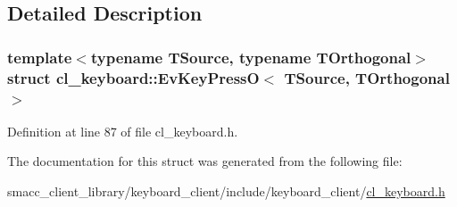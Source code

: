 \subsection{Detailed Description}
\subsubsection*{template$<$typename T\+Source, typename T\+Orthogonal$>$\newline
struct cl\+\_\+keyboard\+::\+Ev\+Key\+Press\+O$<$ T\+Source, T\+Orthogonal $>$}



Definition at line 87 of file cl\+\_\+keyboard.\+h.



The documentation for this struct was generated from the following file\+:\begin{DoxyCompactItemize}
\item 
smacc\+\_\+client\+\_\+library/keyboard\+\_\+client/include/keyboard\+\_\+client/\hyperlink{cl__keyboard_8h}{cl\+\_\+keyboard.\+h}\end{DoxyCompactItemize}
